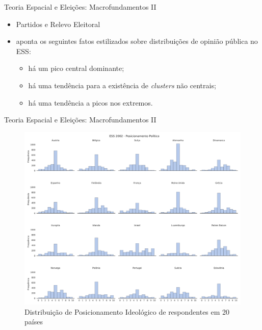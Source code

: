 \documentclass{beamer}
\begin{document}
\begin{frame}{Teoria Espacial e Eleições: Macrofundamentos II}

  \begin{itemize}

  \item Partidos e Relevo Eleitoral
 \item \textcite{flache2017} aponta os seguintes fatos estilizados sobre
   distribuições de opinião pública no ESS:
   
    \begin{itemize}

    \item  há um pico central dominante;
    \item há uma tendência para a existência de \textit{clusters} não centrais;
    \item há uma tendência a picos nos extremos.
      
    \end{itemize}
    
  \end{itemize}
  
\end{frame}

\begin{frame}{Teoria Espacial e Eleições: Macrofundamentos II}  
  \begin{figure}[H]
      \centering \includegraphics[scale = 0.2]{ims/ess_2002_plots.pdf}
    \caption{ Distribuição de Posicionamento Ideológico de respondentes em 20
      países}
    \label{fig2}
  \end{figure}
\end{frame}
\end{document}
